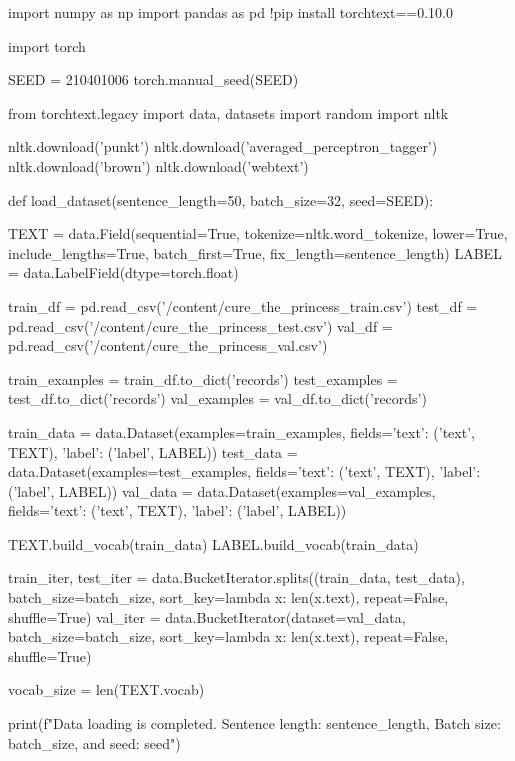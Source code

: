 \documentclass[11pt]{article}
\begin{document}
\begin{python}
import numpy as np
import pandas as pd
!pip install torchtext==0.10.0

import torch

SEED = 210401006
torch.manual_seed(SEED)

from torchtext.legacy import data, datasets
import random
import nltk

nltk.download('punkt')
nltk.download('averaged_perceptron_tagger')
nltk.download('brown')
nltk.download('webtext')

def load_dataset(sentence_length=50, batch_size=32, seed=SEED):

  TEXT = data.Field(sequential=True,
                    tokenize=nltk.word_tokenize,
                    lower=True,
                    include_lengths=True,
                    batch_first=True,
                    fix_length=sentence_length)
  LABEL = data.LabelField(dtype=torch.float)
  
  train_df = pd.read_csv('/content/cure_the_princess_train.csv') 
  test_df = pd.read_csv('/content/cure_the_princess_test.csv')
  val_df = pd.read_csv('/content/cure_the_princess_val.csv')


  train_examples = train_df.to_dict('records')
  test_examples = test_df.to_dict('records')
  val_examples = val_df.to_dict('records')


  train_data = data.Dataset(examples=train_examples, fields={'text': ('text', TEXT), 'label': ('label', LABEL)})
  test_data = data.Dataset(examples=test_examples, fields={'text': ('text', TEXT), 'label': ('label', LABEL)})
  val_data = data.Dataset(examples=val_examples, fields={'text': ('text', TEXT), 'label': ('label', LABEL)})


  TEXT.build_vocab(train_data)
  LABEL.build_vocab(train_data)


  train_iter, test_iter = data.BucketIterator.splits((train_data, test_data),
                                                      batch_size=batch_size, 
                                                      sort_key=lambda x: len(x.text),
                                                      repeat=False, shuffle=True)
  val_iter = data.BucketIterator(dataset=val_data,
                                  batch_size=batch_size, 
                                  sort_key=lambda x: len(x.text),
                                  repeat=False, shuffle=True)

  vocab_size = len(TEXT.vocab)

  print(f"Data loading is completed. Sentence length: {sentence_length}, Batch size: {batch_size}, and seed: {seed}")


\end{python}
\end{document}

